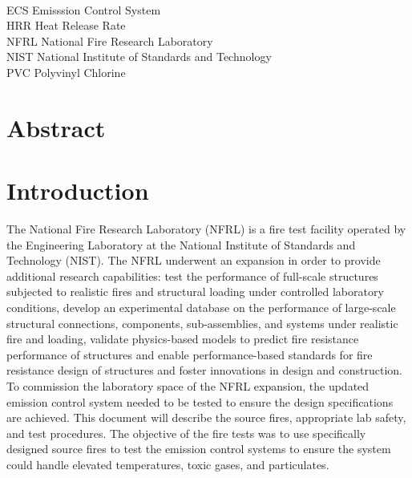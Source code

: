 \documentclass[12pt,oneside]{book}
\begin{document}
\begin{tabbing}
\hspace{1.5in} \= \\
ECS \> Emisssion Control System \\
HRR \> Heat Release Rate \\
NFRL \> National Fire Research Laboratory \\
NIST \> National Institute of Standards and Technology \\
PVC \> Polyvinyl Chlorine \\
\end{tabbing}

\mainmatter

\chapter*{\centering Abstract}

\chapter{Introduction}
\setcounter{page}{1}
The National Fire Research Laboratory (NFRL) is a fire test facility operated by the Engineering Laboratory at the National Institute of Standards and Technology (NIST). The NFRL underwent an expansion in order to provide additional research capabilities: test the performance of full-scale structures subjected to realistic fires and structural loading under controlled laboratory conditions, develop an experimental database on the performance of large-scale structural connections, components, sub-assemblies, and systems under realistic fire and loading, validate physics-based models to predict fire resistance performance of structures and enable performance-based standards for fire resistance design of structures and foster innovations in design and construction. To commission the laboratory space of the NFRL expansion, the updated emission control system needed to be tested to ensure the design specifications are achieved. This document will describe the source fires, appropriate lab safety, and test procedures. The objective of the fire tests was to use specifically designed source fires to test the emission control systems to ensure the system could handle elevated temperatures, toxic gases, and particulates.
\end{document}
